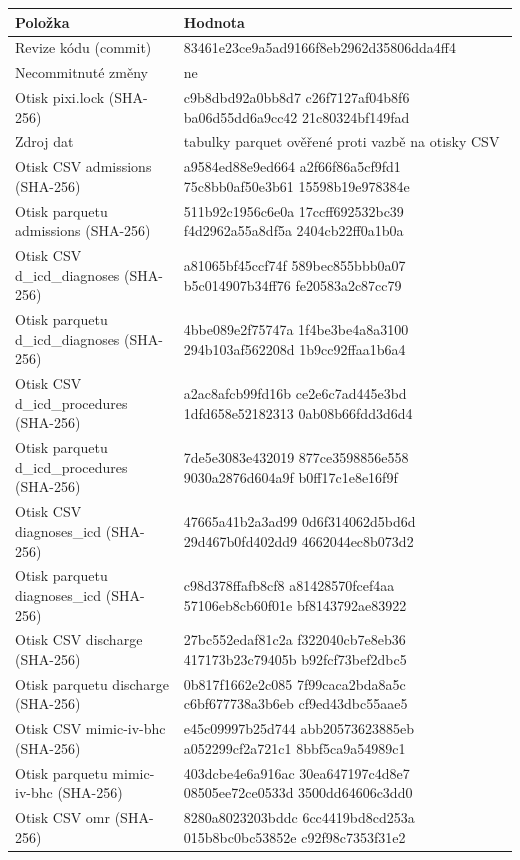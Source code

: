 \begin{tabular}{>{\raggedright\arraybackslash}p{}>{\raggedright\arraybackslash}p{}}
\toprule
Položka & Hodnota\\
\midrule
Revize kódu (commit) & 83461e23ce9a5ad9166f8eb2962d35806dda4ff4\\
Necommitnuté změny & ne\\
Otisk pixi.lock (SHA-256) & c9b8dbd92a0bb8d7 c26f7127af04b8f6 ba06d55dd6a9cc42 21c80324bf149fad\\
Zdroj dat & tabulky parquet ověřené proti vazbě na otisky CSV\\
Otisk CSV admissions (SHA-256) & a9584ed88e9ed664 a2f66f86a5cf9fd1 75c8bb0af50e3b61 15598b19e978384e\\
Otisk parquetu admissions (SHA-256) & 511b92c1956c6e0a 17ccff692532bc39 f4d2962a55a8df5a 2404cb22ff0a1b0a\\
Otisk CSV d\_icd\_diagnoses (SHA-256) & a81065bf45ccf74f 589bec855bbb0a07 b5c014907b34ff76 fe20583a2c87cc79\\
Otisk parquetu d\_icd\_diagnoses (SHA-256) & 4bbe089e2f75747a 1f4be3be4a8a3100 294b103af562208d 1b9cc92ffaa1b6a4\\
Otisk CSV d\_icd\_procedures (SHA-256) & a2ac8afcb99fd16b ce2e6c7ad445e3bd 1dfd658e52182313 0ab08b66fdd3d6d4\\
Otisk parquetu d\_icd\_procedures (SHA-256) & 7de5e3083e432019 877ce3598856e558 9030a2876d604a9f b0ff17c1e8e16f9f\\
Otisk CSV diagnoses\_icd (SHA-256) & 47665a41b2a3ad99 0d6f314062d5bd6d 29d467b0fd402dd9 4662044ec8b073d2\\
Otisk parquetu diagnoses\_icd (SHA-256) & c98d378ffafb8cf8 a81428570fcef4aa 57106eb8cb60f01e bf8143792ae83922\\
Otisk CSV discharge (SHA-256) & 27bc552edaf81c2a f322040cb7e8eb36 417173b23c79405b b92fcf73bef2dbc5\\
Otisk parquetu discharge (SHA-256) & 0b817f1662e2c085 7f99caca2bda8a5c c6bf677738a3b6eb cf9ed43dbc55aae5\\
Otisk CSV mimic-iv-bhc (SHA-256) & e45c09997b25d744 abb20573623885eb a052299cf2a721c1 8bbf5ca9a54989c1\\
Otisk parquetu mimic-iv-bhc (SHA-256) & 403dcbe4e6a916ac 30ea647197c4d8e7 08505ee72ce0533d 3500dd64606c3dd0\\
Otisk CSV omr (SHA-256) & 8280a8023203bddc 6cc4419bd8cd253a 015b8bc0bc53852e c92f98c7353f31e2\\

\end{tabular}
